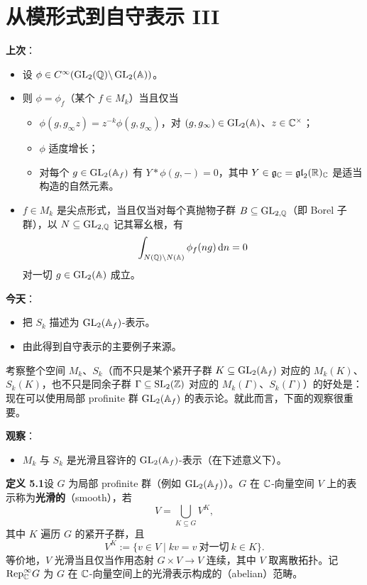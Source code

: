\chapter{从模形式到自守表示 III}

\textbf{上次}：
\begin{itemize}
\item 设 $\phi\in C^\infty(\operatorname{GL}_2(\mathbb{Q})\backslash\operatorname{GL}_2(\mathbb{A}))$。
\item 则 $\phi=\phi_f$（某个 $f\in M_k$）当且仅当
\begin{itemize}
\item $\phi(g,g_\infty z)=z^{-k}\phi(g,g_\infty)$，对 $(g,g_\infty)\in\operatorname{GL}_2(\mathbb{A})$、$z\in\mathbb{C}^\times$；
\item $\phi$ 适度增长；
\item 对每个 $g\in\operatorname{GL}_2(\mathbb{A}_f)$ 有 $Y*\phi(g,-)=0$，其中 $Y\in\mathfrak{g}_{\mathbb{C}}=\mathfrak{gl}_2(\mathbb{R})_{\mathbb{C}}$ 是适当构造的自然元素。
\end{itemize}
\item $f\in M_k$ 是尖点形式，当且仅当对每个真抛物子群 $B\subseteq\operatorname{GL}_{2,\mathbb{Q}}$（即 Borel 子群），以 $N\subseteq\operatorname{GL}_{2,\mathbb{Q}}$ 记其幂幺根，有
\[
\int_{N(\mathbb{Q})\backslash N(\mathbb{A})}\phi_f(ng)\,\mathrm{d}n=0
\]
对一切 $g\in\operatorname{GL}_2(\mathbb{A})$ 成立。
\end{itemize}

\textbf{今天}：
\begin{itemize}
\item 把 $S_k$ 描述为 $\operatorname{GL}_2(\mathbb{A}_f)$-表示。
\item 由此得到自守表示的主要例子来源。
\end{itemize}

考察整个空间 $M_k$、$S_k$（而不只是某个紧开子群 $K\subseteq\operatorname{GL}_2(\mathbb{A}_f)$ 对应的 $M_k(K)$、$S_k(K)$，也不只是同余子群 $\Gamma\subseteq\operatorname{SL}_2(\mathbb{Z})$ 对应的 $M_k(\Gamma)$、$S_k(\Gamma)$）的好处是：现在可以使用局部 profinite 群 $\operatorname{GL}_2(\mathbb{A}_f)$ 的表示论。就此而言，下面的观察很重要。

\textbf{观察}：
\begin{itemize}
\item $M_k$ 与 $S_k$ 是光滑且容许的 $\operatorname{GL}_2(\mathbb{A}_f)$-表示（在下述意义下）。
\end{itemize}

\noindent\textbf{定义 5.1}\label{def:5.1}\quad 设 $G$ 为局部 profinite 群（例如 $\operatorname{GL}_2(\mathbb{A}_f)$）。$G$ 在 $\mathbb{C}$-向量空间 $V$ 上的表示称为\textbf{光滑的}（smooth），若
\[
V=\bigcup_{K\subseteq G}V^K,
\]
其中 $K$ 遍历 $G$ 的紧开子群，且
\[
V^K:=\{v\in V\mid kv=v\ \text{对一切}\ k\in K\}.
\]
等价地，$V$ 光滑当且仅当作用态射 $G\times V\to V$ 连续，其中 $V$ 取离散拓扑。记 $\mathrm{Rep}^\infty_{\mathbb{C}} G$ 为 $G$ 在 $\mathbb{C}$-向量空间上的光滑表示构成的（abelian）范畴。

